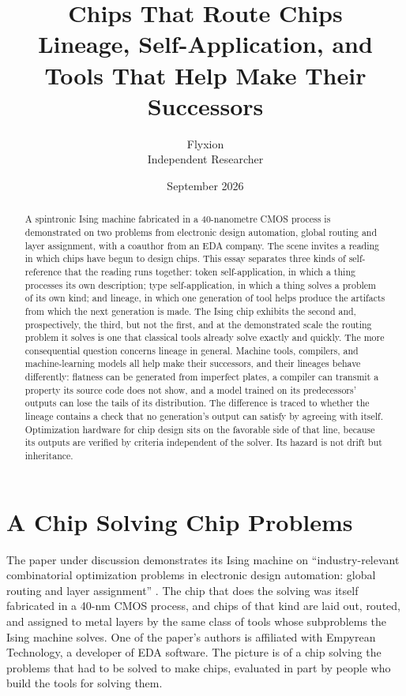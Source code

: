 \documentclass[11pt]{article}
\title{Chips That Route Chips\\[4pt]
\large Lineage, Self-Application, and Tools That Help Make Their Successors}
\author{Flyxion\\ Independent Researcher}
\date{September 2026}
\theoremstyle{definition}
\theoremstyle{remark}
\begin{document}
\maketitle

\begin{abstract}
A spintronic Ising machine fabricated in a 40-nanometre CMOS process is demonstrated on two problems from electronic design automation, global routing and layer assignment, with a coauthor from an EDA company. The scene invites a reading in which chips have begun to design chips. This essay separates three kinds of self-reference that the reading runs together: token self-application, in which a thing processes its own description; type self-application, in which a thing solves a problem of its own kind; and lineage, in which one generation of tool helps produce the artifacts from which the next generation is made. The Ising chip exhibits the second and, prospectively, the third, but not the first, and at the demonstrated scale the routing problem it solves is one that classical tools already solve exactly and quickly. The more consequential question concerns lineage in general. Machine tools, compilers, and machine-learning models all help make their successors, and their lineages behave differently: flatness can be generated from imperfect plates, a compiler can transmit a property its source code does not show, and a model trained on its predecessors' outputs can lose the tails of its distribution. The difference is traced to whether the lineage contains a check that no generation's output can satisfy by agreeing with itself. Optimization hardware for chip design sits on the favorable side of that line, because its outputs are verified by criteria independent of the solver. Its hazard is not drift but inheritance.
\end{abstract}

\section{A Chip Solving Chip Problems}

The paper under discussion demonstrates its Ising machine on ``industry-relevant combinatorial optimization problems in electronic design automation: global routing and layer assignment'' \cite{li2026}. The chip that does the solving was itself fabricated in a 40-nm CMOS process, and chips of that kind are laid out, routed, and assigned to metal layers by the same class of tools whose subproblems the Ising machine solves. One of the paper's authors is affiliated with Empyrean Technology, a developer of EDA software. The picture is of a chip solving the problems that had to be solved to make chips, evaluated in part by people who build the tools for solving them.
\end{document}
